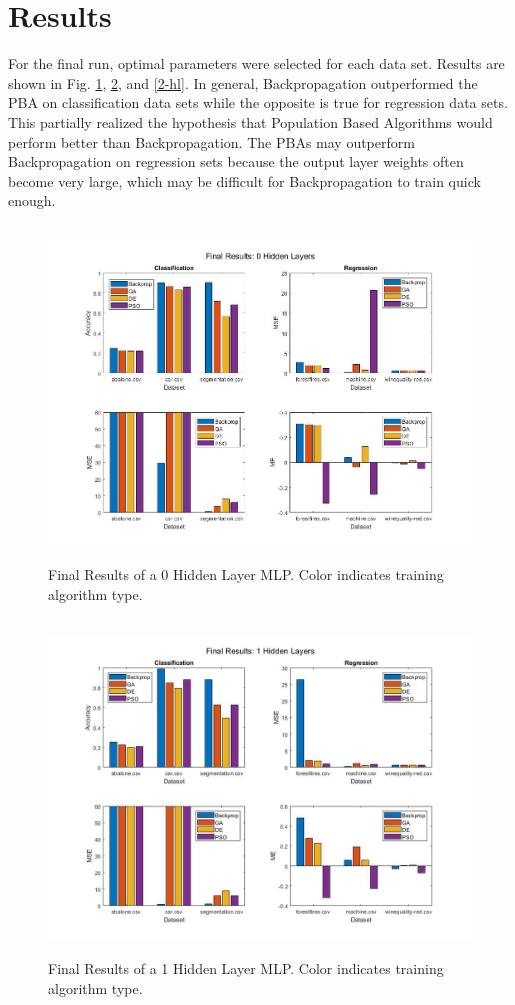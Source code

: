 \documentclass[twoside,11pt]{article}
\begin{document}
\section{Results}

	For the final run, optimal parameters were selected for each data set. Results are shown in Fig. \ref{0-hl}, \ref{1-hl}, and \ref{2-hl}. In general, Backpropagation outperformed the PBA on classification data sets while the opposite is true for regression data sets. This partially realized the hypothesis that Population Based Algorithms would perform better than Backpropagation. The PBAs may outperform Backpropagation on regression sets because the output layer weights often become very large, which may be difficult for Backpropagation to train quick enough. 

	\begin{figure}[h]
		\centering
		\includegraphics[height=3.5in]{FINAL_FIGS/0_hl.jpg}
		\caption{Final Results of a 0 Hidden Layer MLP. Color indicates training algorithm type.}
		\label{0-hl}
	\end{figure}
	
	\begin{figure}[h]
		\centering
		\includegraphics[height=3.5in]{FINAL_FIGS/1_hl.jpg}
		\caption{Final Results of a 1 Hidden Layer MLP. Color indicates training algorithm type.}
		\label{1-hl}
	\end{figure}
	
\end{document}

